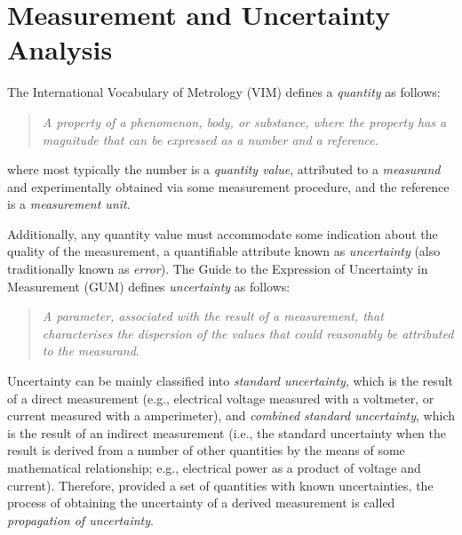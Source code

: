 \documentclass[twoside,nohyper]{tufte-book}
\theoremstyle{definition}
\theoremstyle{definition}
\theoremstyle{definition}
\theoremstyle{remark}
\begin{document}
\section{Measurement and Uncertainty
Analysis}\label{measurement-and-uncertainty-analysis}

The International Vocabulary of Metrology (VIM) defines a
\emph{quantity} as
follows\cite[0pt]{VIM:2012}:

\begin{quote}
\emph{A property of a phenomenon, body, or substance, where the property
has a magnitude that can be expressed as a number and a reference}.
\end{quote}

\noindent where most typically the number is a \emph{quantity value},
attributed to a \emph{measurand} and experimentally obtained via some
measurement procedure, and the reference is a \emph{measurement unit}.

Additionally, any quantity value must accommodate some indication about
the quality of the measurement, a quantifiable attribute known as
\emph{uncertainty} (also traditionally known as \emph{error}). The Guide
to the Expression of Uncertainty in Measurement (GUM) defines
\emph{uncertainty} as
follows\cite[0pt]{GUM:2008}:


\begin{quote}
\emph{A parameter, associated with the result of a measurement, that
characterises the dispersion of the values that could reasonably be
attributed to the measurand}.
\end{quote}

\fussy

Uncertainty can be mainly classified into \emph{standard uncertainty},
which is the result of a direct measurement (e.g., electrical voltage
measured with a voltmeter, or current measured with a amperimeter), and
\emph{combined standard uncertainty}, which is the result of an indirect
measurement (i.e., the standard uncertainty when the result is derived
from a number of other quantities by the means of some mathematical
relationship; e.g., electrical power as a product of voltage and
current). Therefore, provided a set of quantities with known
uncertainties, the process of obtaining the uncertainty of a derived
measurement is called \emph{propagation of uncertainty}.
\end{document}
